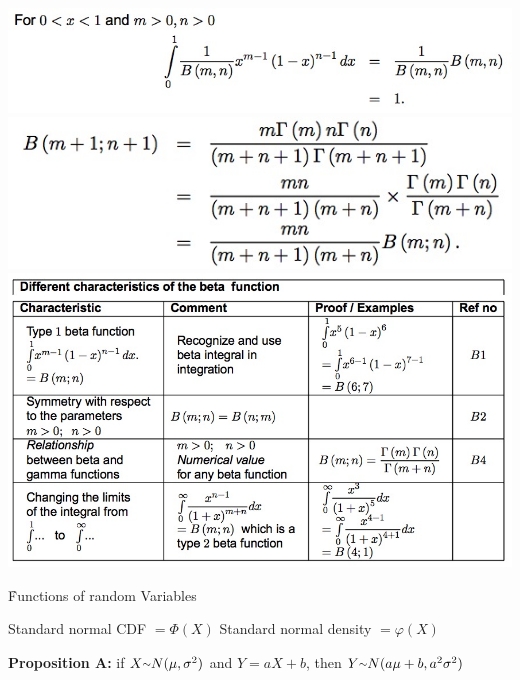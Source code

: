 \documentclass{examnotes}
\begin{document}
{\includegraphics[scale=0.4]{./img/2bet2.jpg}
\includegraphics[scale=0.4]{./img/2bet3.jpg}
\includegraphics[scale=0.5]{./img/2bet1.jpg}


\disobeylines

\obeylines

\h{Functions of random Variables}

Standard normal CDF $= \Phi(X)$ \quad Standard normal density $= \varphi(X)$

{\bf Proposition A:}
if $X\mytilde N(\mu,\sigma^2)$ and $Y=aX+b$, then $Y\mytilde N(a\mu+b,a^2\sigma^2)$

}
\end{document}
